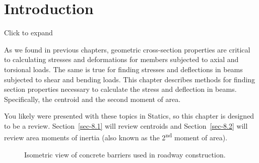 \documentclass[
  letterpaper,
  DIV=11,
  numbers=noendperiod]{scrreprt}
\theoremstyle{definition}
\theoremstyle{remark}
\begin{document}
\section*{Introduction}\label{introduction-7}


Click to expand

As we found in previous chapters, geometric cross-section properties are
critical to calculating stresses and deformations for members subjected
to axial and torsional loads. The same is true for finding stresses and
deflections in beams subjected to shear and bending loads. This chapter
describes methods for finding section properties necessary to calculate
the stress and deflection in beams. Specifically, the centroid and the
second moment of area.

You likely were presented with these topics in Statics, so this chapter
is designed to be a review. Section~\ref{sec-8.1} will review centroids
and Section~\ref{sec-8.2} will review area moments of inertia (also
known as the 2\textsuperscript{nd} moment of area).

\begin{figure}


\caption{\label{fig-8.1}Isometric view of concrete barriers used in
roadway construction.}

\end{figure}%
\end{document}

